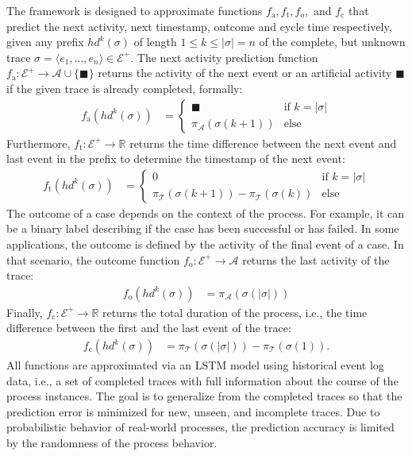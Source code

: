 The framework is designed to approximate functions $f_\mathrm{a}, f_\mathrm{t}, f_\mathrm{o},$ and $f_\mathrm{c}$ that predict the next activity, next timestamp, outcome and cycle time respectively, given any prefix $hd^k(\sigma)$ of length $1 \leq k \leq |\sigma| = n$ of the complete, but unknown trace $\sigma = \langle e_1, \dots, e_{n} \rangle \in \mathcal{E}^+$.
The next activity prediction function $f_\mathrm{a}\colon \mathcal{E}^+ \to \mathcal{A} \cup \{\blacksquare\}$ returns the activity of the next event or an artificial activity $\blacksquare$ if the given trace is already completed, formally:
\begin{align*}
f_\mathrm{a}(hd^k(\sigma)) &= 
\begin{cases}
	\blacksquare& \text{if $k = |\sigma|$} \\
	\pi_\mathcal{A}(\sigma(k+1)) & \text{else} 
\end{cases}
\end{align*}
Furthermore, $f_\mathrm{t} \colon \mathcal{E}^+ \to \mathbb{R}$ returns the time difference between the next event and last event in the prefix to determine the timestamp of the next event:
\begin{align*}
f_\mathrm{t}(hd^k(\sigma)) &=
\begin{cases}
0 & \text{if $k = |\sigma|$} \\
\pi_\mathcal{T}(\sigma(k+1)) - \pi_\mathcal{T}(\sigma(k)) & \text{else} 
\end{cases}
\end{align*}
The outcome of a case depends on the context of the process.
For example, it can be a binary label describing if the case has been successful or has failed.
In some applications, the outcome is defined by the activity of the final event of a case.
In that scenario, the outcome function $f_\mathrm{o} \colon \mathcal{E}^+ \to \mathcal{A}$ returns the last activity of the trace:
\begin{align*}
f_\mathrm{o}(hd^k(\sigma)) &= \pi_\mathcal{A}(\sigma(|\sigma|))
\end{align*}
Finally, $f_\mathrm{c} \colon \mathcal{E}^+ \to \mathbb{R}$ returns the total duration of the process, i.e., the time difference between the first and the last event of the trace:
\begin{align*}
f_\mathrm{c}(hd^k(\sigma)) &=  \pi_\mathcal{T}(\sigma(|\sigma|))-  \pi_\mathcal{T}(\sigma(1)).
\end{align*}
All functions are approximated via an LSTM model using historical event log data, i.e., a set of completed traces with full information about the course of the process instances.
The goal is to generalize from the completed traces so that the prediction error is minimized for new, unseen, and incomplete traces.
Due to probabilistic behavior of real-world processes, the prediction accuracy is limited by the randomness of the process behavior.

